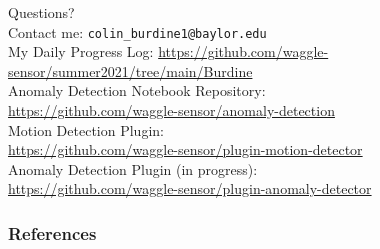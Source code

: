 \documentclass[10pt,handout]{beamer}
\begin{document}
%
%
%
%
%
%
%
%

{
\begin{frame}[standout]
  Questions?\\[2mm]
  Contact me: \texttt{colin\_burdine1@baylor.edu}\\[6mm]
  \small{My Daily Progress Log:
  \href{https://github.com/waggle-sensor/summer2021/tree/main/Burdine}{https://github.com/waggle-sensor/summer2021/tree/main/Burdine}\\[6mm]
  Anomaly Detection Notebook Repository:\\[2mm]
  \href{https://github.com/waggle-sensor/anomaly-detection}{https://github.com/waggle-sensor/anomaly-detection}}\\[6mm]
  Motion Detection Plugin:\\[2mm]
  \href{https://github.com/waggle-sensor/plugin-motion-detector}{https://github.com/waggle-sensor/plugin-motion-detector}\\[6mm]
  Anomaly Detection Plugin (in progress):\\[2mm]
  \href{https://github.com/waggle-sensor/plugin-anomaly-detector}{https://github.com/waggle-sensor/plugin-anomaly-detector}\\[6mm]
\end{frame}}


\begin{frame}[allowframebreaks]
\frametitle{References}


\end{frame}

\appendix

%
\end{document}
